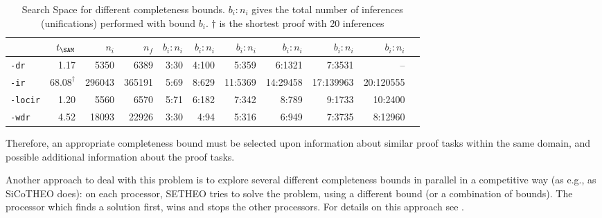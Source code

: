 \begin{table}[htb]
\begin{center}
\footnotesize
\begin{tabular}{|l|r|r|r||r|r|r|r|r|r|r|}
\hline
& $t_{\SAM}$ & $n_i$ & $n_f$ & 
	$b_i:n_i$ &
	$b_i:n_i$ &
	$b_i:n_i$ &
	$b_i:n_i$ &
	$b_i:n_i$ &
	$b_i:n_i$ \\
\hline\hline
{\tt -dr} & 1.17 & 5350 & 6389 &
	3:30 & 4:100 & 5:359 & 6:1321 & 7:3531 & --\\
\hline
{\tt -ir} & $68.08^\dagger$ & 296043 & 365191 &
	5:69 & 8:629 & 11:5369 & 14:29458 & 17:139963 & 20:120555  \\
\hline
{\tt -locir} & 1.20 & 5560 & 6570 &
	5:71 & 6:182 & 7:342 & 8:789 &
	9:1733 & 10:2400 \\
\hline
{\tt -wdr} & 4.52 & 18093 & 22926 &
	3:30 & 4:94 & 5:316 & 6:949 &
	7:3735 & 8:12960 \\
\hline\hline
\end{tabular}
\end{center}
\caption{Search Space for different completeness bounds. $b_i:n_i$ gives the 
	total number of inferences (unifications) performed with bound $b_i$.
	$\dagger$ is the shortest proof with 20 inferences}
\label{tab:tut2:bounds.results}
\end{table}

Therefore, an appropriate completeness bound must be selected upon information
about similar proof tasks within the same domain, and possible additional
information about the proof tasks.

Another approach to deal with this problem is to explore several different
completeness bounds in parallel in a competitive way (as e.g., as SiCoTHEO does):
on each processor, SETHEO tries to solve the problem, using a different
bound (or a combination of bounds). The processor which finds a solution
first, wins and stops the other processors.  
For details on this approach see \cite{Sch96ppai}.
